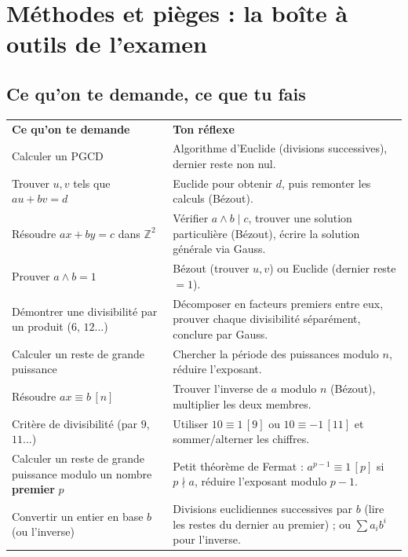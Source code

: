 \documentclass[11pt,a4paper]{article}
\begin{document}
\section{Méthodes et pièges : la boîte à outils de l'examen}

\subsection{Ce qu'on te demande, ce que tu fais}

\begin{center}
\renewcommand{\arraystretch}{1.45}
\sffamily\small
\begin{tabular}{>{\raggedright\arraybackslash}p{7.2cm} >{\raggedright\arraybackslash}p{8cm}}
\rowcolor{qtealdark} \color{white}\bfseries Ce qu'on te demande & \color{white}\bfseries Ton réflexe \\
\rowcolor{tealpale} Calculer un PGCD & Algorithme d'Euclide (divisions successives), dernier reste non nul. \\
Trouver $u,v$ tels que $au+bv=d$ & Euclide pour obtenir $d$, puis remonter les calculs (Bézout). \\
\rowcolor{tealpale} Résoudre $ax+by=c$ dans $\mathbb{Z}^2$ & Vérifier $a\wedge b\mid c$, trouver une solution particulière (Bézout), écrire la solution générale via Gauss. \\
Prouver $a\wedge b=1$ & Bézout (trouver $u,v$) ou Euclide (dernier reste $=1$). \\
\rowcolor{tealpale} Démontrer une divisibilité par un produit ($6$, $12$...) & Décomposer en facteurs premiers entre eux, prouver chaque divisibilité séparément, conclure par Gauss. \\
Calculer un reste de grande puissance & Chercher la période des puissances modulo $n$, réduire l'exposant. \\
\rowcolor{tealpale} Résoudre $ax\equiv b\,[n]$ & Trouver l'inverse de $a$ modulo $n$ (Bézout), multiplier les deux membres. \\
Critère de divisibilité (par $9$, $11$...) & Utiliser $10\equiv1\,[9]$ ou $10\equiv-1\,[11]$ et sommer/alterner les chiffres. \\
\rowcolor{tealpale} Calculer un reste de grande puissance modulo un nombre \textbf{premier} $p$ & Petit théorème de Fermat : $a^{p-1}\equiv1\,[p]$ si $p\nmid a$, réduire l'exposant modulo $p-1$. \\
Convertir un entier en base $b$ (ou l'inverse) & Divisions euclidiennes successives par $b$ (lire les restes du dernier au premier) ; ou $\sum a_ib^i$ pour l'inverse. \\
\end{tabular}
\end{center}
\end{document}
